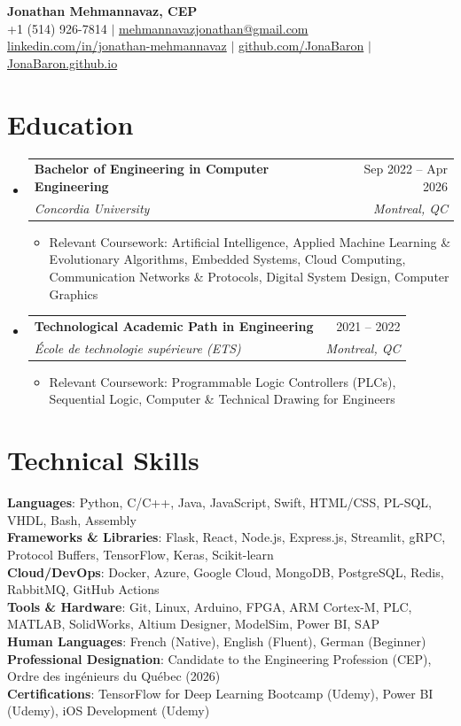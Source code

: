 \documentclass[letterpaper,12pt]{article}
\makeatletter
\newcommand{\resumeItem}[1]{
  \item\small{
    {#1 \vspace{-2pt}}
  }
}
\newcommand{\resumeSubheading}[4]{
  \vspace{-2pt}\item
    \begin{tabular*}{0.97\textwidth}[t]{l@{\extracolsep{\fill}}r}
      \textbf{#1} & #2 \\
      \textit{\small#3} & \textit{\small #4} \\
    \end{tabular*}\vspace{-7pt}
}
\newcommand{\resumeSubHeadingListStart}{\begin{itemize}[leftmargin=0.15in, label={}]}
\newcommand{\resumeSubHeadingListEnd}{\end{itemize}}
\newcommand{\resumeItemListStart}{\begin{itemize}}
\newcommand{\resumeItemListEnd}{\end{itemize}\vspace{-5pt}}
\makeatother
\begin{document}
\begin{center}
    \textbf{\Huge Jonathan Mehmannavaz, CEP} \\ \vspace{1pt}
    \small +1 (514) 926-7814 $|$
    \href{mailto:mehmannavazjonathan@gmail.com}{mehmannavazjonathan@gmail.com} \\
    \href{https://linkedin.com/in/jonathan-mehmannavaz/}{linkedin.com/in/jonathan-mehmannavaz} $|$
    \href{https://github.com/JonaBaron}{github.com/JonaBaron} $|$
    \href{https://JonaBaron.github.io}{JonaBaron.github.io}
\end{center}

\section{Education}
  \resumeSubHeadingListStart
    \resumeSubheading
      {Bachelor of Engineering in Computer Engineering}{Sep 2022 -- Apr 2026}
      {Concordia University}{Montreal, QC}
      \resumeItemListStart
        \resumeItem{Relevant Coursework: Artificial Intelligence, Applied Machine Learning \& Evolutionary Algorithms, Embedded Systems, Cloud Computing, Communication Networks \& Protocols, Digital System Design, Computer Graphics}
      \resumeItemListEnd
    \resumeSubheading
      {Technological Academic Path in Engineering}{2021 -- 2022}
      {\'{E}cole de technologie sup\'{e}rieure (ETS)}{Montreal, QC}
      \resumeItemListStart
        \resumeItem{Relevant Coursework: Programmable Logic Controllers (PLCs), Sequential Logic, Computer \& Technical Drawing for Engineers}
      \resumeItemListEnd
  \resumeSubHeadingListEnd

\section{Technical Skills}
 \begin{itemize}[leftmargin=0.15in, label={}]
    \small{\item{
     \textbf{Languages}{: Python, C/C++, Java, JavaScript, Swift, HTML/CSS, PL-SQL, VHDL, Bash, Assembly} \\
     \textbf{Frameworks \& Libraries}{: Flask, React, Node.js, Express.js, Streamlit, gRPC, Protocol Buffers, TensorFlow, Keras, Scikit-learn} \\
     \textbf{Cloud/DevOps}{: Docker, Azure, Google Cloud, MongoDB, PostgreSQL, Redis, RabbitMQ, GitHub Actions} \\
     \textbf{Tools \& Hardware}{: Git, Linux, Arduino, FPGA, ARM Cortex-M, PLC, MATLAB, SolidWorks, Altium Designer, ModelSim, Power BI, SAP} \\
     \textbf{Human Languages}{: French (Native), English (Fluent), German (Beginner)} \\
     \textbf{Professional Designation}{: Candidate to the Engineering Profession (CEP), Ordre des ing\'{e}nieurs du Qu\'{e}bec (2026)} \\
     \textbf{Certifications}{: TensorFlow for Deep Learning Bootcamp (Udemy), Power BI (Udemy), iOS Development (Udemy)}
    }}
 \end{itemize}
\end{document}
